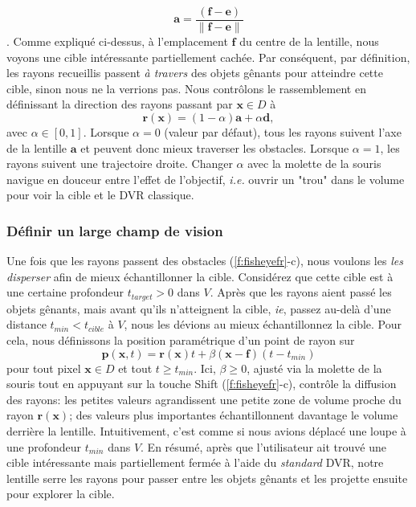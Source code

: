 \begin{equation}
 \mathbf{a} = \frac{(\mathbf{f} - \mathbf{e})}{\| \mathbf{f} - \mathbf{e} \| }
 \end{equation}
 . Comme expliqué ci-dessus, à l'emplacement $ \mathbf{f} $ du centre de la lentille, nous voyons une cible intéressante partiellement cachée. Par conséquent, par définition, les rayons recueillis passent \emph{à travers} des objets gênants pour atteindre cette cible, sinon nous ne la verrions pas. Nous contrôlons le rassemblement en définissant la direction des rayons passant par $ \mathbf{x} \in D $ à
%
\begin{equation}
\mathbf{r}(\mathbf{x}) = (1- \alpha) \mathbf{a} + \alpha \mathbf{d},
\label{eqn:collecte}
\end{equation}
%
avec $ \alpha \in [0,1] $. Lorsque $\alpha = 0 $ (valeur par défaut), tous les rayons suivent l'axe de la lentille $ \mathbf{a} $ et peuvent donc mieux traverser les obstacles. Lorsque $ \alpha = 1 $, les rayons suivent une trajectoire droite. Changer $ \alpha $ avec la molette de la souris navigue en douceur entre l'effet de l'objectif, \emph{i.e.} ouvrir un "trou" dans le volume pour voir la cible et le DVR classique.

\subsubsection{Définir un large champ de vision}
Une fois que les rayons passent des obstacles (\autoref{f:fisheyefr}-c), nous voulons les \emph{les disperser} afin de mieux échantillonner la cible. Considérez que cette cible est à une certaine profondeur $ t_{target}> 0 $ dans $ V $. Après que les rayons aient passé les objets gênants, mais avant qu'ils n'atteignent la cible, \emph{ie}, passez au-delà d'une distance $ t_{min} <t_ {cible} $ à $ V $, nous les dévions au mieux échantillonnez la cible. Pour cela, nous définissons la position paramétrique d’un point de rayon sur
%
\begin{equation}
\mathbf{p}(\mathbf{x}, t) = \mathbf{r}(\mathbf{x})t + \beta (\mathbf{x} - \mathbf{f}) (t-t_{min})
\label{eqn:diffusionfr}
\end{equation}
%
pour tout pixel $ \mathbf{x} \in D $ et tout $ t \geq t_{min} $. Ici, $ \beta \geq 0 $, ajusté via la molette de la souris tout en appuyant sur la touche Shift (\autoref{f:fisheyefr}-c), contrôle la diffusion des rayons: les petites valeurs agrandissent une petite zone de volume proche du rayon $\mathbf{r}(\mathbf{x}) $; des valeurs plus importantes échantillonnent davantage le volume derrière la lentille. Intuitivement, c'est comme si nous avions déplacé une loupe à une profondeur $ t_{min} $ dans $ V $. En résumé, après que l'utilisateur ait trouvé une cible intéressante mais partiellement fermée à l'aide du \emph{standard} DVR, notre lentille serre les rayons pour passer entre les objets gênants et les projette ensuite pour explorer la cible.

